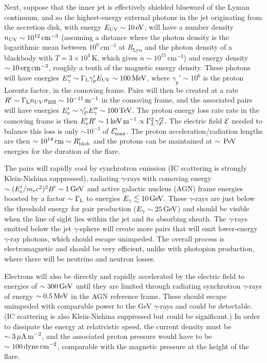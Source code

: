 \documentclass[twocolumn]{aastex62}
\newcommand{\Grays}{$\gamma$-rays\xspace}
\newcommand{\gray}{$\gamma$-ray\xspace}
\begin{document}
Next, suppose that the inner jet is effectively shielded blueward of the Lyman continuum, and so the highest-energy external photons in the jet originating from the accretion disk, with energy $E_{\rm UV}\sim10\,{\rm eV}$, will have a number density $n_{\rm UV}\sim10^{12}\,{\rm cm}^{-3}$ (assuming a distance where the photon density is the logarithmic mean between $10^9\,\mathrm{cm}^{-3}$ at $R_\mathrm{Ly\alpha}$ and the photon density of a blackbody with $T = 3\times10^4\,$K, which gives $n\sim10^{15}\,\mathrm{cm}^{-3}$) and energy density $\sim10\,{\rm erg\,cm}^{-3}$, roughly a tenth of the magnetic energy density. These photons will have energies $E_\gamma''\sim\Gamma_{\rm L}\gamma_p'E_{\rm UV}\sim100\,{\rm MeV}$, where $\gamma_p'\sim10^6$ is the proton Lorentz factor, in the comoving frame. Pairs will then be created at a rate $R'\sim\Gamma_{\rm L}n_{UV}\sigma_{\rm BH}\sim10^{-11}\,{\rm m}^{-1}$ in the comoving frame, and the associated pairs will have energies $E_e'\sim \gamma_P'E_\gamma''\sim100\,{\rm TeV}$. The proton energy loss rate rate in the comoving frame is then $E_e'R'\sim1\,{\rm keV}\,{\rm m}^{-1}\propto\Gamma_L^2\gamma_P'^2$. 
The electric field $\cal E$ needed to balance this loss is only $\sim10^{-3}$ of ${\cal E}_{\rm max}'$. 
The proton acceleration/radiation lengths are then $\sim10^{14}\,{\rm cm}\sim R_{\rm blob}'$ and the protons can be maintained at $\sim\,{\rm PeV}$ energies for the duration of the flare.

The pairs will rapidly cool by synchrotron emission (IC scattering is strongly Klein-Nishina suppressed), radiating \Grays with comoving energy $\sim (E_e'/m_ec^2)^2 B' \sim 1\,{\rm GeV}$ and active galactic nucleus (AGN) frame energies boosted by a factor $\sim\Gamma_{\rm L}$ to energies $E_\gamma\lesssim10\,{\rm GeV}$. 
These \Grays are just below the threshold energy for pair production ($E_\gamma\sim25\,{\rm GeV}$) and should be visible when the line of sight lies within the jet and its absorbing sheath.
The \Grays emitted below the jet $\gamma$-sphere will create more pairs that will emit lower-energy \gray photons, which should escape unimpeded. The overall process is electromagnetic and should be very efficient, unlike with photopion production, where there will be neutrino and neutron losses. 

Electrons will also be directly and rapidly accelerated by the electric field to energies of $\sim300\,{\rm GeV}$ until they are limited through radiating synchrotron \Grays of energy $\sim0.5\,{\rm MeV}$ in the AGN reference frame. These should escape unimpeded with comparable power to the GeV \Grays and could be detectable. (IC scattering is also Klein-Nishina suppressed but could be significant.) In order to dissipate the energy at relativistic speed, the current density must be $\sim3\,\mu{\rm A\,m}^{-2}$, and the associated proton pressure would have to be $\sim100\,{\rm dyne\,cm}^{-2}$, comparable with the magnetic pressure at the height of the flare.
\end{document}
